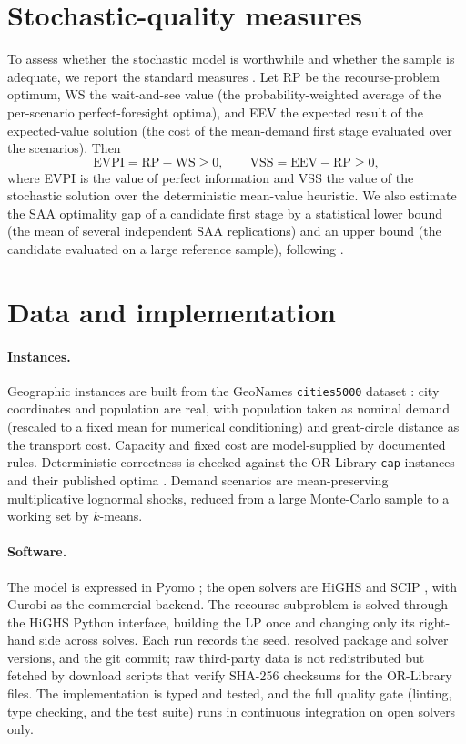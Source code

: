 \documentclass[11pt]{article}
\begin{document}
\section{Stochastic-quality measures}
\label{sec:measures}

To assess whether the stochastic model is worthwhile and whether the sample is
adequate, we report the standard measures \citep{birge2011,kleywegt2002,mak1999}.
Let RP be the recourse-problem optimum, WS the wait-and-see value (the
probability-weighted average of the per-scenario perfect-foresight optima), and
EEV the expected result of the expected-value solution (the cost of the
mean-demand first stage evaluated over the scenarios). Then
\begin{equation}
  \text{EVPI} = \text{RP} - \text{WS} \ge 0, \qquad
  \text{VSS} = \text{EEV} - \text{RP} \ge 0,
\end{equation}
where EVPI is the value of perfect information and VSS the value of the stochastic
solution over the deterministic mean-value heuristic. We also estimate the SAA
optimality gap of a candidate first stage by a statistical lower bound (the mean of
several independent SAA replications) and an upper bound (the candidate evaluated on
a large reference sample), following \citet{mak1999,kleywegt2002}.

\section{Data and implementation}
\label{sec:data}

\paragraph{Instances.}
Geographic instances are built from the GeoNames \texttt{cities5000} dataset
\citep{geonames}: city coordinates and population are real, with population taken as
nominal demand (rescaled to a fixed mean for numerical conditioning) and great-circle
distance as the transport cost. Capacity and fixed cost are model-supplied by
documented rules. Deterministic correctness is checked against the OR-Library
\texttt{cap} instances and their published optima \citep{beasley1990}. Demand
scenarios are mean-preserving multiplicative lognormal shocks, reduced from a large
Monte-Carlo sample to a working set by $k$-means.

\paragraph{Software.}
The model is expressed in Pyomo \citep{pyomo}; the open solvers are HiGHS
\citep{huangfu2018} and SCIP \citep{scip2023}, with Gurobi \citep{gurobi} as the
commercial backend. The recourse subproblem is solved through the HiGHS Python
interface, building the LP once and changing only its right-hand side across solves.
Each run records the seed, resolved package and solver versions, and the git commit;
raw third-party data is not redistributed but fetched by download scripts that
verify SHA-256 checksums for the OR-Library files. The implementation is typed and
tested, and the full quality gate (linting, type checking, and the test suite) runs
in continuous integration on open solvers only.
\end{document}
